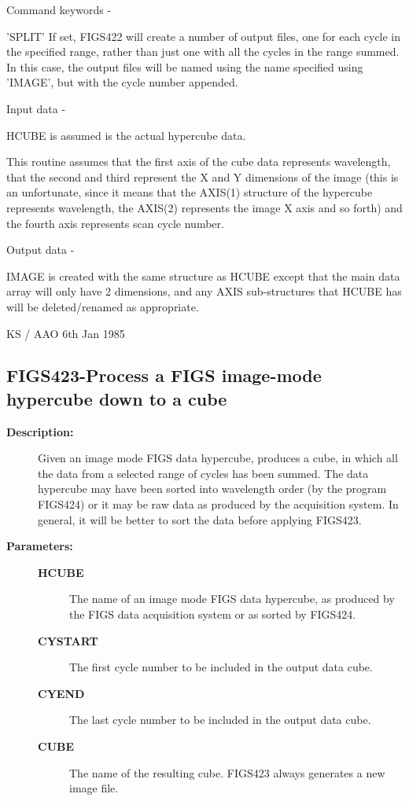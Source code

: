 \begin{description}
\begin{description}
\begin{terminalv}
 Command keywords -

 'SPLIT'    If set, FIGS422 will create a number of output
            files, one for each cycle in the specified range,
            rather than just one with all the cycles in the range
            summed.  In this case, the output files will be named
            using the name specified using 'IMAGE', but with the
            cycle number appended.

 Input data -

 HCUBE is assumed is the actual hypercube data.

 This routine assumes that the first axis of the cube data
 represents wavelength, that the second and third represent the
 X and Y dimensions of the image (this is an unfortunate,
 since it means that the AXIS(1) structure of the hypercube represents
 wavelength, the AXIS(2) represents the image X axis and so forth)
 and the fourth axis represents scan cycle number.

 Output data -

 IMAGE is created with the same structure as HCUBE
 except that the main data array will only have 2 dimensions, and any
 AXIS sub-structures that HCUBE has will be
 deleted/renamed as appropriate.

                                 KS / AAO 6th Jan 1985
\end{terminalv}
\end{description}
\subsection{FIGS423-\label{FIGS423}Process a FIGS image-mode hypercube down to a cube}
\begin{description}

\item [\textbf{Description:}]
 Given an image mode FIGS data hypercube, produces a cube,
 in which all the data from a selected range of cycles has
 been summed.  The data hypercube may have been sorted into
 wavelength order (by the program FIGS424) or it may be raw
 data as produced by the acquisition system.  In general, it
 will be better to sort the data before applying FIGS423.

\item [\textbf{Parameters:}]
\begin{description}
\item [\textbf{HCUBE}]
 The name of an image mode FIGS data hypercube,
 as produced by the FIGS data acquisition system
 or as sorted by FIGS424.
\item [\textbf{CYSTART}]
 The first cycle number to be included in the
 output data cube.
\item [\textbf{CYEND}]
 The last cycle number to be included in the
 output data cube.
\item [\textbf{CUBE}]
 The name of the resulting cube.
 FIGS423 always generates a new image file.
\end{description}


\end{description}
\end{description}
